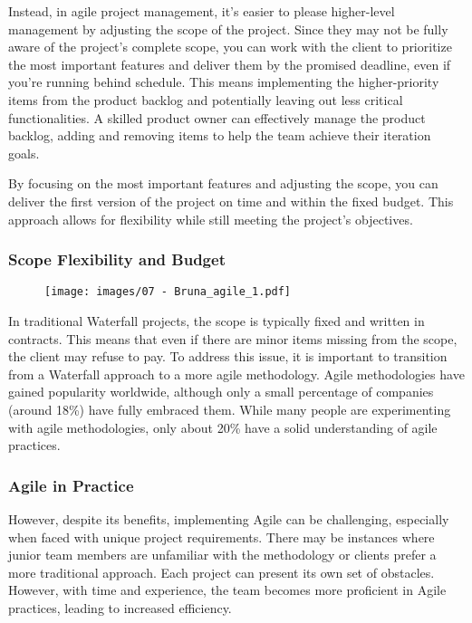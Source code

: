 Instead, in agile project management, it's easier to please higher-level
management by adjusting the scope of the project. Since they may not be
fully aware of the project's complete scope, you can work with the
client to prioritize the most important features and deliver them by the
promised deadline, even if you're running behind schedule. This means
implementing the higher-priority items from the product backlog and
potentially leaving out less critical functionalities. A skilled product
owner can effectively manage the product backlog, adding and removing
items to help the team achieve their iteration goals.

By focusing on the most important features and adjusting the scope, you
can deliver the first version of the project on time and within the
fixed budget. This approach allows for flexibility while still meeting
the project's objectives.

\subsubsection{Scope Flexibility and Budget}

\begin{figure}[!h]
    \centering
    \texttt{[image: images/07 - Bruna\_agile\_1.pdf]}
\end{figure}

In traditional Waterfall projects, the scope is typically fixed and
written in contracts. This means that even if there are minor items
missing from the scope, the client may refuse to pay. To address this
issue, it is important to transition from a Waterfall approach to a more
agile methodology. Agile methodologies have gained popularity worldwide,
although only a small percentage of companies (around 18\%) have fully
embraced them. While many people are experimenting with agile
methodologies, only about 20\% have a solid understanding of agile
practices.

\subsubsection{Agile in Practice}

However, despite its benefits, implementing Agile can be challenging,
especially when faced with unique project requirements. There may be
instances where junior team members are unfamiliar with the methodology
or clients prefer a more traditional approach. Each project can present
its own set of obstacles. However, with time and experience, the team
becomes more proficient in Agile practices, leading to increased
efficiency.

